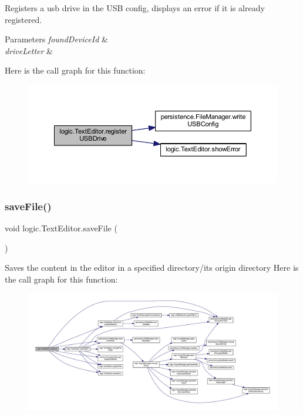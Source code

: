 Registers a usb drive in the U\+SB config, displays an error if it is already registered. 
\begin{DoxyParams}{Parameters}
{\em found\+Device\+Id} & \\
\hline
{\em drive\+Letter} & \\
\hline
\end{DoxyParams}
Here is the call graph for this function\+:\nopagebreak
\begin{figure}[H]
\begin{center}
\leavevmode
\includegraphics[width=350pt]{classlogic_1_1_text_editor_aeb8b26927002020f35d2dc6cc8ececfe_cgraph}
\end{center}
\end{figure}
\mbox{\label{classlogic_1_1_text_editor_ae11be4a147a095ce667576ce50f210b2}} 
\subsubsection{\texorpdfstring{save\+File()}{saveFile()}}
{\footnotesize\ttfamily void logic.\+Text\+Editor.\+save\+File (\begin{DoxyParamCaption}{ }\end{DoxyParamCaption})}

Saves the content in the editor in a specified directory/its origin directory Here is the call graph for this function\+:\nopagebreak
\begin{figure}[H]
\begin{center}
\leavevmode
\includegraphics[width=350pt]{classlogic_1_1_text_editor_ae11be4a147a095ce667576ce50f210b2_cgraph}
\end{center}
\end{figure}
\mbox{\label{classlogic_1_1_text_editor_a0581e73a9b3b6ae54a8e69de49fb9ed5}} 
